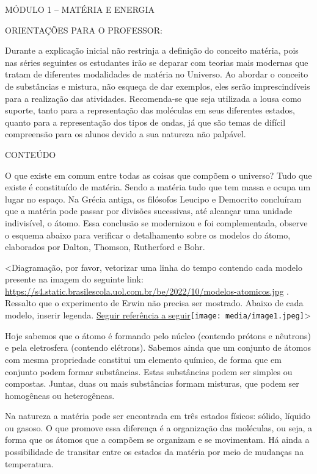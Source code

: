 MÓDULO 1 -- MATÉRIA E ENERGIA

ORIENTAÇÕES PARA O PROFESSOR:

Durante a explicação inicial não restrinja a definição do conceito
matéria, pois nas séries seguintes os estudantes irão se deparar com
teorias mais modernas que tratam de diferentes modalidades de matéria no
Universo. Ao abordar o conceito de substâncias e mistura, não esqueça de
dar exemplos, eles serão imprescindíveis para a realização das
atividades. Recomenda-se que seja utilizada a lousa como suporte, tanto
para a representação das moléculas em seus diferentes estados, quanto
para a representação dos tipos de ondas, já que são temas de difícil
compreensão para os alunos devido a sua natureza não palpável.

CONTEÚDO

O que existe em comum entre todas as coisas que compõem o universo? Tudo
que existe é constituído de matéria. Sendo a matéria tudo que tem massa
e ocupa um lugar no espaço. Na Grécia antiga, os filósofos Leucipo e
Democrito concluíram que a matéria pode passar por divisões sucessivas,
até alcançar uma unidade indivisível, o átomo. Essa conclusão se
modernizou e foi complementada, observe o esquema abaixo para verificar
o detalhamento sobre os modelos do átomo, elaborados por Dalton,
Thomson, Rutherford e Bohr.

\textless{}Diagramação, por favor, vetorizar uma linha do tempo contendo
cada modelo presente na imagem do seguinte link:
\url{https://s4.static.brasilescola.uol.com.br/be/2022/10/modelos-atomicos.jpg}
. Ressalto que o experimento de Erwin não precisa ser mostrado. Abaixo
de cada modelo, inserir legenda.
\href{https://www.canva.com/design/DAFbBrqqdV4/BW25s5tGLD6ZWtasgU9iCg/view?utm_content=DAFbBrqqdV4\&utm_campaign=designshare\&utm_medium=link2\&utm_source=sharebutton}{Seguir
referência a
seguir}\texttt{[image: media/image1.jpeg]}\textgreater{}

Hoje sabemos que o átomo é formando pelo núcleo (contendo prótons e
nêutrons) e pela eletrosfera (contendo elétrons). Sabemos ainda que um
conjunto de átomos com mesma propriedade constitui um elemento químico,
de forma que em conjunto podem formar substâncias. Estas substâncias
podem ser simples ou compostas. Juntas, duas ou mais substâncias formam
misturas, que podem ser homogêneas ou heterogêneas.

Na natureza a matéria pode ser encontrada em três estados físicos:
sólido, líquido ou gasoso. O que promove essa diferença é a organização
das moléculas, ou seja, a forma que os átomos que a compõem se organizam
e se movimentam. Há ainda a possibilidade de transitar entre os estados
da matéria por meio de mudanças na temperatura.

